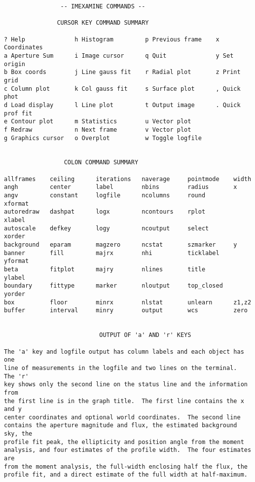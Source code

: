 \begingroup \fontsize{10pt}{10pt}
\selectfont
\begin{verbatim} 
			    -- IMEXAMINE COMMANDS --

			   CURSOR KEY COMMAND SUMMARY

? Help              h Histogram         p Previous frame    x Coordinates
a Aperture Sum      i Image cursor      q Quit              y Set origin
b Box coords        j Line gauss fit    r Radial plot       z Print grid
c Column plot       k Col gauss fit     s Surface plot      , Quick phot
d Load display      l Line plot         t Output image      . Quick prof fit
e Contour plot      m Statistics        u Vector plot       
f Redraw            n Next frame        v Vector plot       
g Graphics cursor   o Overplot          w Toggle logfile    


			     COLON COMMAND SUMMARY

allframes    ceiling      iterations   naverage     pointmode    width
angh         center       label        nbins        radius       x
angv         constant     logfile      ncolumns     round        xformat
autoredraw   dashpat      logx         ncontours    rplot        xlabel
autoscale    defkey       logy         ncoutput     select       xorder
background   eparam       magzero      ncstat       szmarker     y
banner       fill         majrx        nhi          ticklabel    yformat
beta         fitplot      majry        nlines       title        ylabel
boundary     fittype      marker       nloutput     top_closed   yorder
box          floor        minrx        nlstat       unlearn      z1,z2
buffer       interval     minry        output       wcs          zero


                           OUTPUT OF 'a' AND 'r' KEYS

The 'a' key and logfile output has column labels and each object has one
line of measurements in the logfile and two lines on the terminal.  The 'r'
key shows only the second line on the status line and the information from
the first line is in the graph title.  The first line contains the x and y
center coordinates and optional world coordinates.  The second line
contains the aperture magnitude and flux, the estimated background sky, the
profile fit peak, the ellipticity and position angle from the moment
analysis, and four estimates of the profile width.  The four estimates are
from the moment analysis, the full-width enclosing half the flux, the
profile fit, and a direct estimate of the full width at half-maximum.



\end{verbatim}
